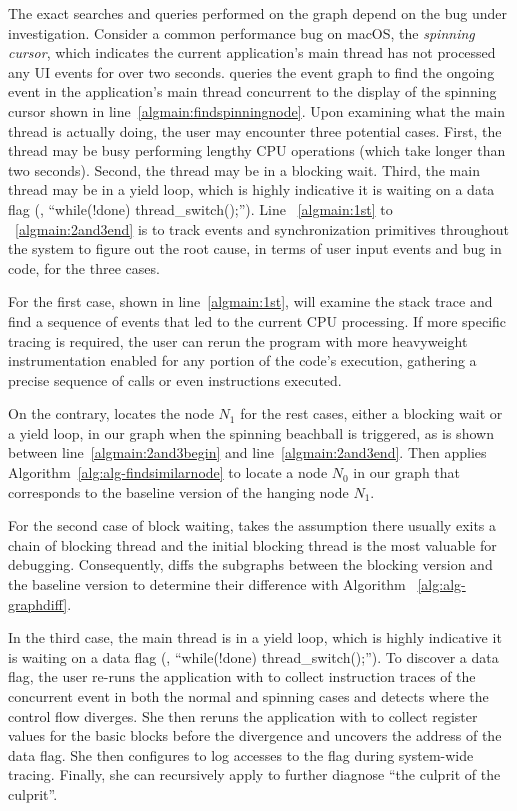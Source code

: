 The exact searches and queries performed on the graph depend on the bug under
investigation. Consider a common performance bug on macOS, the \emph{spinning
cursor}, which indicates the current application's main thread has not processed
any UI events for over two seconds. \xxx queries the event graph to find the
ongoing event in the application's main thread concurrent to the display of
the spinning cursor shown in line~\ref{algmain:findspinningnode}. Upon examining
what the main thread is actually doing, the user may encounter three potential
cases. First, the thread may be busy performing lengthy CPU operations (which
take longer than two seconds). Second, the thread may be in a blocking wait.
Third, the main thread may be in a yield loop, which is highly indicative
it is waiting on a data flag (\eg, ``while(!done) thread\_switch();'').
Line ~\ref{algmain:1st} to ~\ref{algmain:2and3end} is to track events and
synchronization primitives throughout the system to figure out the root cause,
in terms of user input events and bug in code, for the three cases.

For the first case, shown in line~\ref{algmain:1st}, \xxx will examine
the stack trace and find a sequence of events that led to the current CPU
processing. If more specific tracing is required, the user can rerun the
program with more heavyweight instrumentation enabled for any portion of the
code's execution, gathering a precise sequence of calls or even instructions
executed.

On the contrary, \xxx locates the node $N_1$ for the rest
cases, either a blocking wait or a yield loop, in our graph
when the spinning beachball is triggered, as is shown between
line~\ref{algmain:2and3begin} and line~\ref{algmain:2and3end}. Then \xxx applies
Algorithm~\ref{alg:alg-findsimilarnode} to locate a node $N_0$ in our graph that
corresponds to the baseline version of the hanging node $N_1$.

For the second case of block waiting, \xxx takes the assumption there usually
exits a chain of blocking thread and the initial blocking thread is the most
valuable for debugging. Consequently, \xxx diffs the subgraphs between the
blocking version and the baseline version to determine their difference with
Algorithm ~\ref{alg:alg-graphdiff}.

In the third case, the main thread is in a yield loop, which is highly indicative it is
waiting on a data flag (\eg, ``while(!done) thread\_switch();''). To discover
a data flag, the user re-runs the application with \xxx to collect instruction
traces of the concurrent event in both the normal and spinning cases and detects
where the control flow diverges. She then reruns the application with \xxx to
collect register values for the basic blocks before the divergence and uncovers
the address of the data flag. She then configures \xxx to log accesses to the
flag during system-wide tracing. Finally, she can recursively apply \xxx to
further diagnose ``the culprit of the culprit''.


